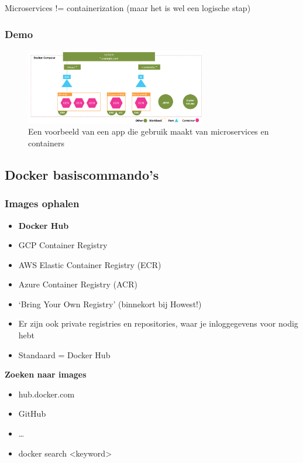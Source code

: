 \documentclass{article}
\begin{document}
Microservices != containerization (maar het is wel een logische stap)

\subsubsection{Demo}

\begin{figure}[H]
    \centering
    \includegraphics[width=0.7\textwidth]{microservices-demo.png}
    \caption{Een voorbeeld van een app die gebruik maakt van microservices en containers}
\end{figure}

\subsection{Docker basiscommando's}

\subsubsection{Images ophalen}

\begin{itemize}
    \item \textbf{Docker Hub}
    \item GCP Container Registry
    \item AWS Elastic Container Registry (ECR)
    \item Azure Container Registry (ACR)
    \item `Bring Your Own Registry' (binnekort bij Howest!)
    \item Er zijn ook private registries en repositories, waar je inloggegevens voor nodig hebt
    \item Standaard = Docker Hub
\end{itemize}

\textbf{Zoeken naar images}

\begin{itemize}
    \item hub.docker.com
    \item GitHub
    \item \dots
    \item docker search <keyword>
\end{itemize}
\end{document}
